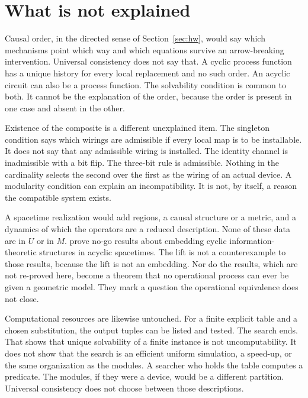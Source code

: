 \documentclass[11pt]{article}
\begin{document}
\section{What is not explained}
\label{sec:not}

Causal order, in the directed sense of Section~\ref{sec:hw}, would say which mechanisms point which way and which equations survive an arrow-breaking intervention. Universal consistency does not say that. A cyclic process function has a unique history for every local replacement and no such order. An acyclic circuit can also be a process function. The solvability condition is common to both. It cannot be the explanation of the order, because the order is present in one case and absent in the other.

Existence of the composite is a different unexplained item. The singleton condition says which wirings are admissible if every local map is to be installable. It does not say that any admissible wiring is installed. The identity channel is inadmissible with a bit flip. The three-bit rule is admissible. Nothing in the cardinality selects the second over the first as the wiring of an actual device. A modularity condition can explain an incompatibility. It is not, by itself, a reason the compatible system exists.

A spacetime realization would add regions, a causal structure or a metric, and a dynamics of which the operators are a reduced description. None of these data are in \(U\) or in \(M\). \citet{vilasini2024} prove no-go results about embedding cyclic information-theoretic structures in acyclic spacetimes. The lift is not a counterexample to those results, because the lift is not an embedding. Nor do the results, which are not re-proved here, become a theorem that no operational process can ever be given a geometric model. They mark a question the operational equivalence does not close.

Computational resources are likewise untouched. For a finite explicit table and a chosen substitution, the output tuples can be listed and tested. The search ends. That shows that unique solvability of a finite instance is not uncomputability. It does not show that the search is an efficient uniform simulation, a speed-up, or the same organization as the modules. A searcher who holds the table computes a predicate. The modules, if they were a device, would be a different partition. Universal consistency does not choose between those descriptions.
\end{document}
